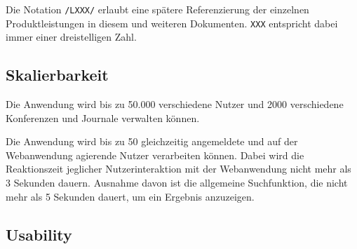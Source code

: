 
Die Notation \texttt{/LXXX/} erlaubt eine spätere Referenzierung der einzelnen Produktleistungen in diesem und weiteren
Dokumenten. \texttt{XXX} entspricht dabei immer einer dreistelligen Zahl.

\subsection{Skalierbarkeit}

\begin{description}

	 Die Anwendung wird bis zu 50.000 verschiedene Nutzer und 2000 verschiedene Konferenzen und Journale verwalten können.

	 Die Anwendung wird bis zu 50 gleichzeitig angemeldete und auf der Webanwendung agierende Nutzer verarbeiten können. Dabei wird die Reaktionszeit jeglicher Nutzerinteraktion mit der Webanwendung nicht mehr als 3 Sekunden dauern. Ausnahme davon ist die allgemeine Suchfunktion, die nicht mehr als 5 Sekunden dauert, um ein Ergebnis anzuzeigen.

\end{description}

\subsection{Usability}


